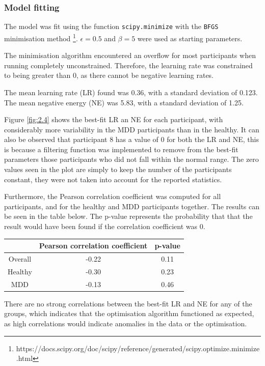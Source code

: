 \documentclass[12pt]{article}
\begin{document}
\subsubsection{Model fitting}

The model was fit using the function \texttt{scipy.minimize} with the \texttt{BFGS} minimisation method \footnote{https://docs.scipy.org/doc/scipy/reference/generated/scipy.optimize.minimize.html}. $\epsilon = 0.5$ and $\beta = 5$ were used as starting parameters.

The minimisation algorithm encountered an overflow for most participants when running completely unconstrained. Therefore, the learning rate was constrained to being greater than 0, as there cannot be negative learning rates.

The mean learning rate (LR) found was 0.36, with a standard deviation of 0.123. The mean negative energy (NE) was 5.83, with a standard deviation of 1.25. 

Figure \ref{fig:2.4} shows the best-fit LR an NE for each participant, with considerably more variability in the MDD participants than in the healthy. It can also be observed that participant 8 has a value of 0 for both the LR and NE, this is because a filtering function was implemented to remove from the best-fit parameters those participants who did not fall within the normal range. The zero values seen in the plot are simply to keep the number of the participants constant, they were not taken into account for the reported statistics. 

Furthermore, the Pearson correlation coefficient was computed for all participants, and for the healthy and MDD participants together. The results can be seen in the table below. The p-value represents the probability that that the result would have been found if the correlation coefficient was 0.

\begin{center}
 \begin{tabular}{|c || c | c |} 
 \hline
  & Pearson correlation coefficient & p-value  \\ [0.5ex] 
 \hline\hline
 Overall & -0.22 & 0.11 \\ 
 \hline
 Healthy & -0.30 & 0.23 \\
 MDD & -0.13 & 0.46 \\ [1ex] 
 \hline
\end{tabular}
\end{center}

There are no strong correlations between the best-fit LR and NE for any of the groups, which indicates that the optimisation algorithm functioned as expected, as high correlations would indicate anomalies in the data or the optimisation. 
\end{document}
